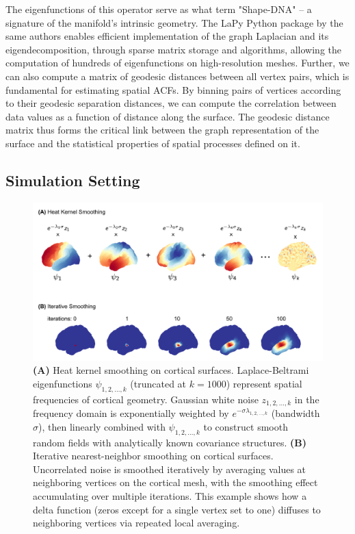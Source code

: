 \documentclass{article}
\begin{document}
The eigenfunctions of this operator serve as what \citet{reuter_laplacebeltrami_2006} term "Shape-DNA" -- a signature of the manifold's intrinsic geometry. The LaPy Python package by the same authors enables efficient implementation of the graph Laplacian and its eigendecomposition, through sparse matrix storage and algorithms, allowing the computation of hundreds of eigenfunctions on high-resolution meshes. Further, we can also compute a matrix of geodesic distances between all vertex pairs, which is fundamental for estimating spatial ACFs. By binning pairs of vertices according to their geodesic separation distances, we can compute the correlation between data values as a function of distance along the surface. The geodesic distance matrix thus forms the critical link between the graph representation of the surface and the statistical properties of spatial processes defined on it.

\newpage
\subsection{Simulation Setting}
\begin{figure}[!ht]
    \centering
    \includegraphics[width=0.9\linewidth]{project/figures/fig05.png}
    \caption{
    \textbf{(A)} Heat kernel smoothing on cortical surfaces. Laplace-Beltrami eigenfunctions $\psi_{1, 2, \dots, k}$ (truncated at $k=1000$) represent spatial frequencies of cortical geometry. Gaussian white noise $z_{1, 2, \dots, k}$ in the frequency domain is exponentially weighted by $e^{-\sigma\lambda_{1, 2, \dots, k}}$ (bandwidth $\sigma$), then linearly combined with $\psi_{1, 2, \dots, k}$ to construct smooth random fields with analytically known covariance structures.
    \textbf{(B)} Iterative nearest-neighbor smoothing on cortical surfaces. Uncorrelated noise is smoothed iteratively by averaging values at neighboring vertices on the cortical mesh, with the smoothing effect accumulating over multiple iterations. This example shows how a delta function (zeros except for a single vertex set to one) diffuses to neighboring vertices via repeated local averaging. 
    }
    \label{fig:simulation-setting}
\end{figure}
\end{document}
